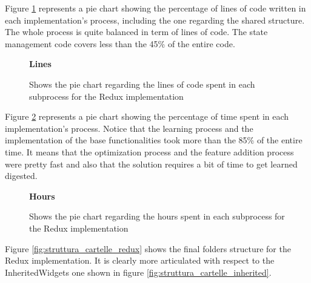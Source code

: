 Figure \ref{image:redux_lines_piechart} represents a pie chart showing the percentage of lines of code written in each implementation's process, including the one regarding the shared structure. The whole process is quite balanced in term of lines of code. The state management code covers less than the 45\% of the entire code.
\begin{figure}[H]

\caption*{\textbf{Lines}}
\centering
{}
 \caption{Shows the pie chart regarding the lines of code spent in each subprocess for the Redux implementation}
 \label{image:redux_lines_piechart}

\end{figure}
Figure \ref{image:redux_hours_piechart} represents a pie chart showing the percentage of time spent in each implementation's process. Notice that the learning process and the implementation of the base functionalities took more than the 85\% of the entire time. It means that the optimization process and the feature addition process were pretty fast and also that the solution requires a bit of time to get learned digested.
\begin{figure}[H]
 \caption*{\textbf{Hours}}
\centering
{}
 \caption{Shows the pie chart regarding the hours spent in each subprocess for the Redux implementation}
 \label{image:redux_hours_piechart}

\end{figure}
Figure \ref{fig:struttura_cartelle_redux} shows the final folders structure for the Redux implementation. It is clearly more articulated with respect to the InheritedWidgets one shown in figure     \ref{fig:struttura_cartelle_inherited}.
